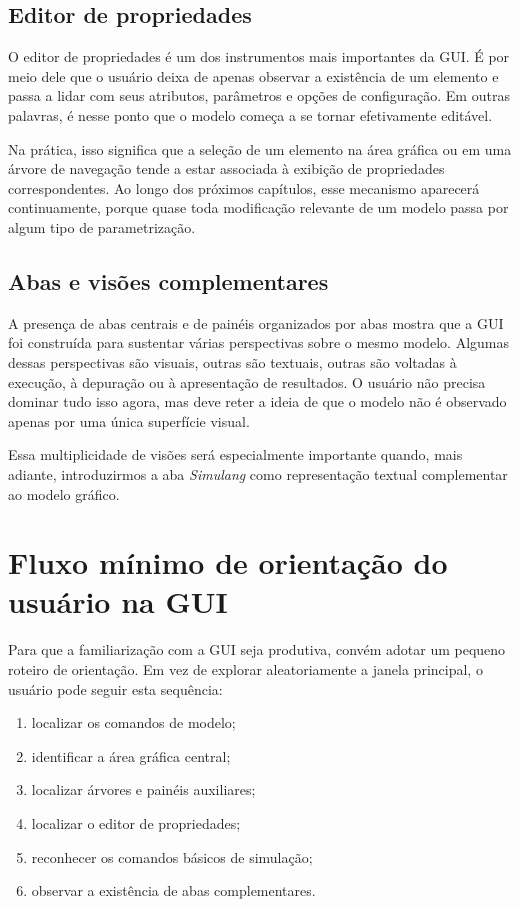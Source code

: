 \subsection{Editor de propriedades}
\label{subsec:cap3_editor_propriedades}

O editor de propriedades é um dos instrumentos mais importantes da GUI. É por meio dele que o usuário deixa de apenas observar a existência de um elemento e passa a lidar com seus atributos, parâmetros e opções de configuração. Em outras palavras, é nesse ponto que o modelo começa a se tornar efetivamente editável.

Na prática, isso significa que a seleção de um elemento na área gráfica ou em uma árvore de navegação tende a estar associada à exibição de propriedades correspondentes. Ao longo dos próximos capítulos, esse mecanismo aparecerá continuamente, porque quase toda modificação relevante de um modelo passa por algum tipo de parametrização.

\subsection{Abas e visões complementares}
\label{subsec:cap3_abas_visoes_complementares}

A presença de abas centrais e de painéis organizados por abas mostra que a GUI foi construída para sustentar várias perspectivas sobre o mesmo modelo. Algumas dessas perspectivas são visuais, outras são textuais, outras são voltadas à execução, à depuração ou à apresentação de resultados. O usuário não precisa dominar tudo isso agora, mas deve reter a ideia de que o modelo não é observado apenas por uma única superfície visual.

Essa multiplicidade de visões será especialmente importante quando, mais adiante, introduzirmos a aba \textit{Simulang} como representação textual complementar ao modelo gráfico.

\section{Fluxo mínimo de orientação do usuário na GUI}
\label{sec:cap3_fluxo_minimo_orientacao}

Para que a familiarização com a GUI seja produtiva, convém adotar um pequeno roteiro de orientação. Em vez de explorar aleatoriamente a janela principal, o usuário pode seguir esta sequência:

\begin{enumerate}
    \item localizar os comandos de modelo;
    \item identificar a área gráfica central;
    \item localizar árvores e painéis auxiliares;
    \item localizar o editor de propriedades;
    \item reconhecer os comandos básicos de simulação;
    \item observar a existência de abas complementares.
\end{enumerate}

